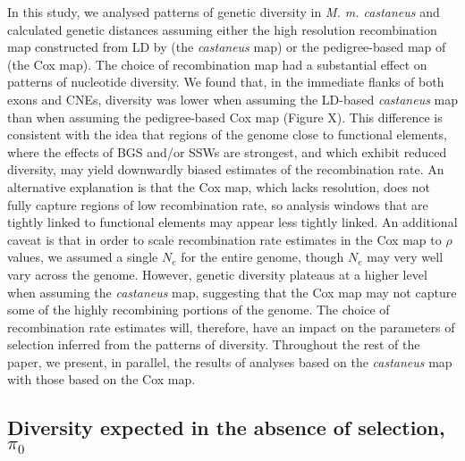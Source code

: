 	In this study, we analysed patterns of genetic diversity in \textit{M. m. castaneus} and calculated genetic distances assuming either the high resolution recombination map constructed from LD by \cite{RN340}(the \textit{castaneus} map) or the pedigree-based map of \cite{RN232} (the Cox map). The choice of recombination map had a substantial effect on patterns of nucleotide diversity. We found that, in the immediate flanks of both exons and CNEs, diversity was lower when assuming the LD-based \textit{castaneus} map than when assuming the pedigree-based Cox map (Figure X). This difference is consistent with the idea that regions of the genome close to functional elements, where the effects of BGS and/or SSWs are strongest, and which exhibit reduced diversity, may yield downwardly biased estimates of the recombination rate. An alternative explanation is that the Cox map, which lacks resolution, does not fully capture regions of low recombination rate, so analysis windows that are tightly linked to functional elements may appear less tightly linked. An additional caveat is that in order to scale  recombination rate estimates in the Cox map to $\rho$ values, we assumed a single $N_e$ for the entire genome, though $N_e$ may very well vary across the genome. However, genetic diversity  plateaus at a higher level when assuming the \textit{castaneus} map, suggesting that the Cox map may not capture some of the highly recombining portions of the genome. The choice of recombination rate estimates will, therefore, have an impact on the parameters of selection inferred from the patterns of diversity. Throughout the rest of the paper, we present, in parallel, the results of analyses based on the \textit{castaneus} map with those based on the Cox map.

	\subsection{Diversity expected in the absence of selection, $\pi_0$}

